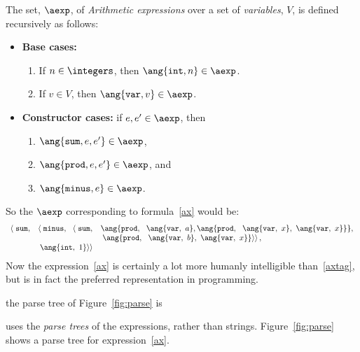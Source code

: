 \begin{definition}
\begin{definition}\label{A}
The set, $\aexp$, of \emph{Arithmetic expressions} over a set of
\emph{variables}, $V$, is defined recursively as follows:
\begin{itemize}
\item \textbf{Base cases:}
\begin{enumerate}
\item If $n \in \integers$, then $\ang{\texttt{int}, n} \in \aexp$.
\item If $v \in V$, then $\ang{\texttt{var}, v} \in \aexp$.
\end{enumerate}
\item \textbf{Constructor cases:} if $e,e' \in \aexp$, then
\begin{enumerate}
\item $\ang{\texttt{sum}, e, e'} \in \aexp$,
\item $\ang{\texttt{prod}, e, e'} \in \aexp$, and
\item $\ang{\texttt{minus}, e} \in \aexp$.
\end{enumerate}
\end{itemize}
\end{definition}

So the $\aexp$ corresponding to formula~\ref{ax} would be:
\begin{equation}\label{axtag}
\begin{array}{rll}
\left< \right. \texttt{sum}, 
         & \left< \right. \texttt{minus},\ \ \left< \right. \texttt{sum},
               & \ang{\texttt{prod},\ \ \ang{\texttt{var},\ a},
                                     \ang{\texttt{prod},\ \
                                            \ang{\texttt{var},\ x},\
                                            \ang{\texttt{var},\ x}}},\\
                               && \left. \left. \ang{\texttt{prod},\ \
                                       \ang{\texttt{var},\ b},\
                                       \ang{\texttt{var},\ x}}
                                   \right> \right>,\\
         & \left. \left. \ang{\texttt{int},\ 1} \right> \right>
\end{array}
\end{equation}
Now the expression~\ref{ax} is certainly a lot more humanly intelligible
than~\ref{axtag}, but is in fact the preferred representation in
programming.

the parse tree of Figure~\ref{fig:parse} is

uses the \emph{parse trees} of the expressions,
rather than strings.  Figure~\ref{fig:parse} shows a
parse tree for expression~\eqref{ax}.


\end{definition}

